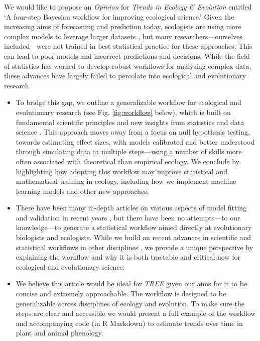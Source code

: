 \documentclass[11pt]{article}
\begin{document}
We would like to propose an \emph{Opinion} for \emph{Trends in Ecology \& Evolution} entitled `A four-step Bayesian workflow for improving ecological science.' %
Given the increasing aims of forecasting and prediction today, ecologists are using more complex models to leverage larger datasets \citep{anderson2021trends,muff2022rewriting}, but many researchers---ourselves included---were not trained in best statistical practice for these approaches. This  can lead to poor models and incorrect predictions and decisions. While the field of statistics has worked to develop robust workflows for analysing complex data, these advances have largely failed to percolate into ecological and evolutionary research.%
\begin{itemize}
\item To bridge this gap, we outline a generalizable workflow for ecological and evolutionary research (see Fig. \ref{fig:workflow} below), which is built on fundamental scientific principles and new insights from statistics and data science \citep[][]{grinsztajn2021,vandeschoot2021}. This approach  moves away from a focus on null hypothesis testing, towards estimating effect sizes, with models calibrated and better understood through simulating data at multiple steps---using a number of skills more often associated with theoretical than empirical ecology. We conclude by highlighting how adopting this workflow may improve statistical and mathematical training in ecology, including how we implement machine learning models and other new approaches. 
\item There have been many in-depth articles on various aspects of model fitting and validation in recent years \citep[e.g.][]{conn2018,gabryvis,tredennick2021practical,direnzo2023practical}, but there have been no attempts---to our knowledge---to generate a statistical workflow aimed directly at evolutionary biologists and ecologists. While we build on recent advances in scientific and statistical workflows in other disciplines \citep{gelman2020bayesian,grinsztajn2021,schad2021}, we provide a unique perspective by explaining the workflow and why it is both tractable and critical now for ecological and evolutionary science. 
\item We believe this article would be ideal for \emph{TREE} given our aims for it to be concise and extremely approachable. The workflow is designed to be generalizable across disciplines of ecology and evolution. To make sure the steps are clear and accessible we would present a full example of the workflow and accompanying code (in R Markdown) to estimate trends over time in plant and animal phenology. 
\end{itemize}
\end{document}
